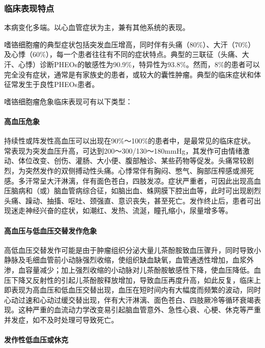 \subsubsection{临床表现特点}

本病变化多端。以心血管症状为主，兼有其他系统的表现。

嗜铬细胞瘤的典型症状包括突发血压增高，同时伴有头痛（80\%）、大汗（70\%）及心悸（60\%），每一个患者往往有不同的症状特点。典型的三联征（头痛、大汗、心悸）诊断PHEOs的敏感性为90.9\%，特异性为93.8\%。然而，8\%的患者可以完全没有症状，通常是有家族史的患者，或较大的囊性肿瘤。典型的临床症状和体征常发生于良性PHEOs患者。

嗜铬细胞瘤危象临床表现可有以下类型：

\paragraph{高血压危象}

持续性或阵发性高血压可以出现在90\%～100\%的患者中，是最常见的临床症状。常表现为突发血压升高，可达到200～300/130～180mmHg，其发作可由情绪激动、体位改变、创伤、灌肠、大小便、腹部触诊、某些药物等促发。头痛常较剧烈，为突然发作的双侧搏动性头痛。心悸常伴有胸闷、憋气、胸部压榨感或濒死感。多汗常呈大汗淋漓，伴有面色苍白，四肢发凉。症状严重者，可因此出现高血压脑病和（或）脑血管病综合征，如脑出血、蛛网膜下腔出血等，此时可出现剧烈头痛、躁动、抽搐、呕吐、颈强直、意识丧失，甚至死亡。发作终止后，患者可出现迷走神经兴奋的症状，如潮红、发热、流涎，瞳孔缩小，尿量增多等。

\paragraph{高血压与低血压交替发作危象}

高低血压交替发作可能是由于肿瘤组织分泌大量儿茶酚胺致血压骤升，同时导致小静脉及毛细血管前小动脉强烈收缩，使组织缺血缺氧，血管通透性增加，血浆外渗，血容量减少；加上强烈收缩的小动脉对儿茶酚胺敏感性下降，使血压降低。血压下降又反射性的引起儿茶酚胺释放增加，导致血压再度升高，如此反复，临床上即表现为高血压和低血压交替出现，血压在短时间内有大幅度而频繁的波动，同时心动过速和心动过缓交替出现，伴有大汗淋漓、面色苍白、四肢厥冷等循环衰竭表现。这种严重的血流动力学改变易引起脑血管意外、急性心衰、心梗、休克等严重并发症，如不及时处理可导致死亡。

\paragraph{发作性低血压或休克}

